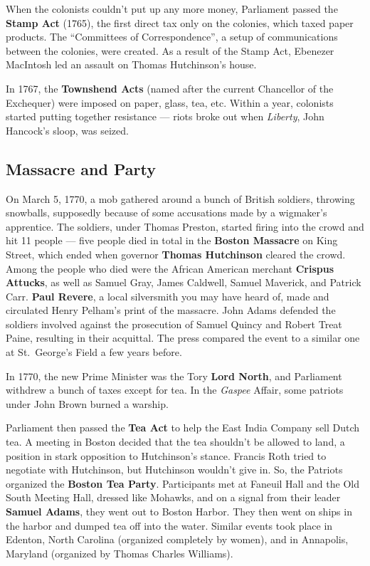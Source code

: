 When the colonists couldn't put up any more money,
Parliament passed the \textbf{Stamp Act} (1765),
the first direct tax only on the colonies, which taxed paper products.
The ``Committees of Correspondence'', a setup of communications between the colonies, were created.
As a result of the Stamp Act, Ebenezer MacIntosh led an assault on Thomas Hutchinson's house.

In 1767, the \textbf{Townshend Acts} (named after the current Chancellor of the Exchequer)
were imposed on paper, glass, tea, etc.
Within a year, colonists started putting together resistance ---
riots broke out when \textit{Liberty}, John Hancock's sloop, was seized.

\subsection*{Massacre and Party}

On March 5, 1770, a mob gathered around a bunch of British soldiers, throwing snowballs,
supposedly because of some accusations made by a wigmaker's apprentice.
The soldiers, under Thomas Preston, started firing into the crowd and hit 11 people ---
five people died in total in the \textbf{Boston Massacre} on King Street,
which ended when governor \textbf{Thomas Hutchinson} cleared the crowd.
Among the people who died were the African American merchant \textbf{Crispus Attucks},
as well as Samuel Gray, James Caldwell, Samuel Maverick, and Patrick Carr.
\textbf{Paul Revere}, a local silversmith you may have heard of,
made and circulated Henry Pelham's print of the massacre.
John Adams defended the soldiers involved
against the prosecution of Samuel Quincy and Robert Treat Paine,
resulting in their acquittal.
The press compared the event to a similar one at St.\ George's Field a few years before.

In 1770, the new Prime Minister was the Tory \textbf{Lord North},
and Parliament withdrew a bunch of taxes except for tea.
In the \textit{Gaspee} Affair, some patriots under John Brown burned a warship.

Parliament then passed the \textbf{Tea Act} to help the East India Company sell Dutch tea.
A meeting in Boston decided that the tea shouldn't be allowed to land,
a position in stark opposition to Hutchinson's stance.
Francis Roth tried to negotiate with Hutchinson, but Hutchinson wouldn't give in.
So, the Patriots organized the \textbf{Boston Tea Party}.
Participants met at Faneuil Hall and the Old South Meeting Hall, dressed like Mohawks,
and on a signal from their leader \textbf{Samuel Adams}, they went out to Boston Harbor.
They then went on ships in the harbor and dumped tea off into the water.
Similar events took place in Edenton, North Carolina (organized completely by women),
and in Annapolis, Maryland (organized by Thomas Charles Williams).

